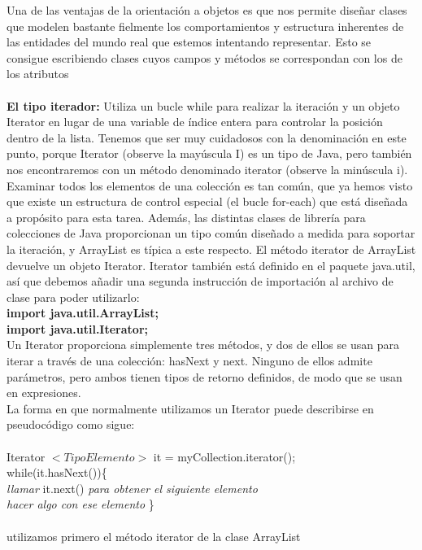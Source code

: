 \documentclass[11pt,a4paper]{article}
\begin{document}
	Una de las ventajas de la orientación a objetos es que nos permite diseñar clases que modelen
	bastante fielmente los comportamientos y estructura inherentes de las entidades del mundo real
	que estemos intentando representar. Esto se consigue escribiendo clases cuyos campos y métodos
	se correspondan con los de los atributos\\
	\\
	\textbf{El tipo iterador:} Utiliza un bucle
	while para realizar la iteración y un objeto Iterator en lugar de una variable de índice entera para
	controlar la posición dentro de la lista. Tenemos que ser muy cuidadosos con la denominación en
	este punto, porque Iterator (observe la mayúscula I) es un tipo de Java, pero también nos encontraremos
	con un método denominado iterator (observe la minúscula i).\\
	Examinar todos los elementos de una colección es tan común, que ya hemos visto que existe un
	estructura de control especial (el bucle for-each) que está diseñada a propósito para esta tarea. Además,
	las distintas clases de librería para colecciones de Java proporcionan un tipo común diseñado
	a medida para soportar la iteración, y ArrayList es típica a este respecto.
	El método iterator de ArrayList devuelve un objeto Iterator. Iterator también está
	definido en el paquete java.util, así que debemos añadir una segunda instrucción de importación
	al archivo de clase para poder utilizarlo:\\
	\textbf{import java.util.ArrayList;}\\
	\textbf{import java.util.Iterator;}\\
	Un Iterator proporciona simplemente tres métodos, y dos de ellos se usan para iterar a través de
	una colección: hasNext y next. Ninguno de ellos admite parámetros, pero ambos tienen tipos
	de retorno definidos, de modo que se usan en expresiones.\\
	La forma en que normalmente utilizamos
	un Iterator puede describirse en pseudocódigo como sigue:\\
	\\
	Iterator $<TipoElemento>$ it = myCollection.iterator();\\
	while(it.hasNext())\{\\
	\textit{llamar} it.next() \textit{para obtener el siguiente elemento}\\
	\textit{hacer algo con ese elemento}
	\}\\
	\\
	utilizamos primero el método iterator de la clase ArrayList
\end{document}
